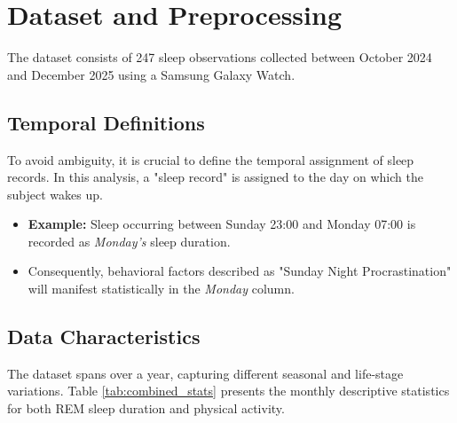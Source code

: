 \documentclass[conference]{IEEEtran}
\begin{document}
\section{Dataset and Preprocessing}
The dataset consists of 247 sleep observations collected between October 2024 and December 2025 using a Samsung Galaxy Watch.

\subsection{Temporal Definitions}
To avoid ambiguity, it is crucial to define the temporal assignment of sleep records. In this analysis, a "sleep record" is assigned to the day on which the subject wakes up.
\begin{itemize}
    \item \textbf{Example:} Sleep occurring between Sunday 23:00 and Monday 07:00 is recorded as \textit{Monday's} sleep duration.
    \item Consequently, behavioral factors described as "Sunday Night Procrastination" will manifest statistically in the \textit{Monday} column.
\end{itemize}

\subsection{Data Characteristics}
The dataset spans over a year, capturing different seasonal and life-stage variations. Table \ref{tab:combined_stats} presents the monthly descriptive statistics for both REM sleep duration and physical activity.
\end{document}

